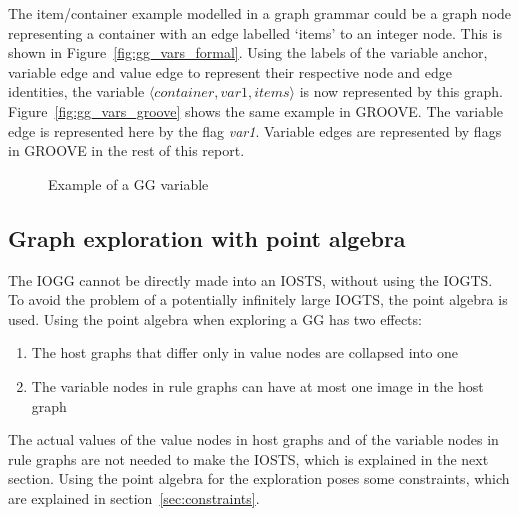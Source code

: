 The item/container example modelled in a graph grammar could be a graph node representing a container with an edge labelled `items' to an integer node. This is shown in Figure~\ref{fig:gg_vars_formal}. Using the labels of the variable anchor, variable edge and value edge to represent their respective node and edge identities, the variable $\langle \mathit{container, var1, items}\rangle$ is now represented by this graph. Figure~\ref{fig:gg_vars_groove} shows the same example in GROOVE. The variable edge is represented here by the flag \textit{var1}. Variable edges are represented by flags in GROOVE in the rest of this report. 

\begin{figure}[ht]
  \begin{center}
    \subfloat[Formal]{\label{fig:gg_vars_formal}\parbox[b]{4cm}{\centering}}
    \subfloat[GROOVE]{\label{fig:gg_vars_groove}\parbox[b]{4cm}{\centering}}
  \end{center}
  \caption{Example of a GG variable}
  \label{fig:vars-in-ggs}
\end{figure}

\subsection{Graph exploration with point algebra} 
The IOGG cannot be directly made into an IOSTS, without using the IOGTS. To avoid the problem of a potentially infinitely large IOGTS, the point algebra is used. Using the point algebra when exploring a GG has two effects:
\begin{enumerate}
\item The host graphs that differ only in value nodes are collapsed into one
\item The variable nodes in rule graphs can have at most one image in the host graph
\end{enumerate}
The actual values of the value nodes in host graphs and of the variable nodes in rule graphs are not needed to make the IOSTS, which is explained in the next section. Using the point algebra for the exploration poses some constraints, which are explained in section~\ref{sec:constraints}.

